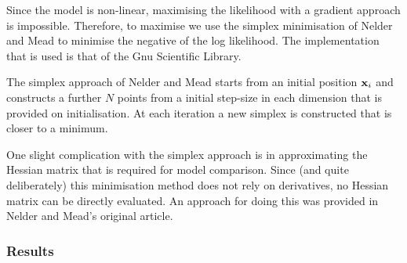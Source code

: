 Since the model is non-linear,
maximising the likelihood with a gradient approach is impossible.
Therefore, to maximise 
we use the simplex minimisation of Nelder and Mead\cite{Nelder1965}
to minimise the negative of the log likelihood.
The implementation that is used is that of the Gnu Scientific Library.

The simplex approach of Nelder and Mead\cite{Nelder1965} starts from an initial position $\mathbf{x}_i$ and
constructs a further $N$ points from a initial step-size in each dimension that is provided on initialisation.
At each iteration a new simplex is constructed that is closer to a minimum.

One slight complication with the simplex approach is in approximating the Hessian matrix
that is required for model comparison.
Since (and quite deliberately)
this minimisation method does not rely on derivatives,
no Hessian matrix can be directly evaluated.
An approach for doing this was provided in  Nelder and Mead's original article\cite{Nelder1965}.



\subsubsection{Results}




